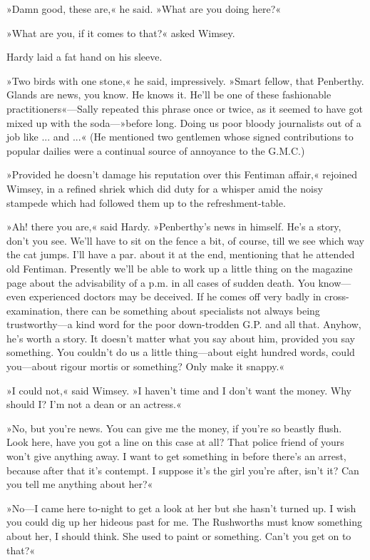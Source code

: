 »Damn good, these are,« he said. »What are you doing here?«

»What are you, if it comes to that?« asked Wimsey.

Hardy laid a fat hand on his sleeve.

»Two birds with one stone,« he said, impressively. »Smart fellow, that Penberthy. Glands are news, you know. He knows it. He'll be one of these fashionable practitioners«---Sally repeated this phrase once or twice, as it seemed to have got mixed up with the soda---»before long. Doing us poor bloody journalists out of a job like ... and ...« (He mentioned two gentlemen whose signed contributions to popular dailies were a continual source of annoyance to the G.M.C.)

»Provided he doesn't damage his reputation over this Fentiman affair,« rejoined Wimsey, in a refined shriek which did duty for a whisper amid the noisy stampede which had followed them up to the refreshment-table.

»Ah! there you are,« said Hardy. »Penberthy's news in himself. He's a story, don't you see. We'll have to sit on the fence a bit, of course, till we see which way the cat jumps. I'll have a par. about it at the end, mentioning that he attended old Fentiman. Presently we'll be able to work up a little thing on the magazine page about the advisability of a p.m. in all cases of sudden death. You know\allowbreak---\allowbreak even experienced doctors may be deceived. If he comes off very badly in cross-examination, there can be something about specialists not always being trustworthy\allowbreak---\allowbreak a kind word for the poor down-trodden G.P. and all that. Anyhow, he's worth a story. It doesn't matter what you say about him, provided you say something. You couldn't do us a little thing\allowbreak---\allowbreak about eight hundred words, could you\allowbreak---\allowbreak about rigour mortis or something? Only make it snappy.«

»I could not,« said Wimsey. »I haven't time and I don't want the money. Why should I? I'm not a dean or an actress.«

»No, but you're news. You can give me the money, if you're so beastly flush. Look here, have you got a line on this case at all? That police friend of yours won't give anything away. I want to get something in before there's an arrest, because after that it's contempt. I suppose it's the girl you're after, isn't it? Can you tell me anything about her?«

»No\allowbreak---\allowbreak I came here to-night to get a look at her but she hasn't turned up. I wish you could dig up her hideous past for me. The Rushworths must know something about her, I should think. She used to paint or something. Can't you get on to that?«

